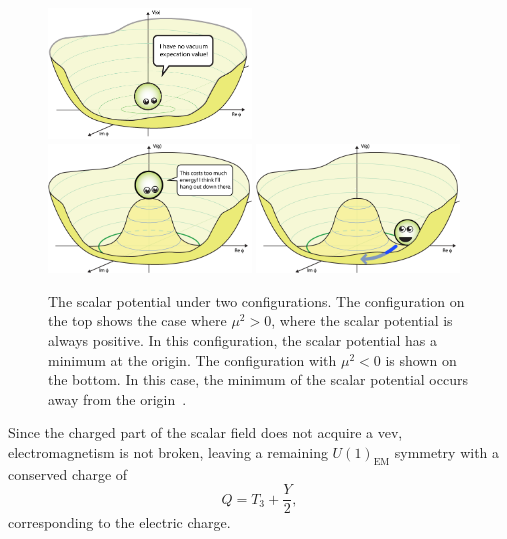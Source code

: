 \begin{figure}[th]
  \centering
  \includegraphics[width=0.48\textwidth]
      {figs/theory/BoringPotential.png}
  \\
  \includegraphics[width=0.48\textwidth]
  {figs/theory/Higgs-Potential-lookdown.png}
  \includegraphics[width=0.48\textwidth]
  {figs/theory/Higgs-Potential-Goldstone.png}
  \caption[
    The scalar potential under two configurations:
    $\mu^2 > 0$ and $\mu^2 < 0$~\cite{QuantumDiariesHiggs}.
  ]{
    The scalar potential under two configurations.
    The configuration on the top shows the case where $\mu^2 > 0$, where
    the scalar potential is always positive.
    In this configuration, the scalar potential has a minimum at the origin.
    The configuration with $\mu^2 < 0$ is shown on the bottom.
    In this case, the minimum of the scalar potential occurs away from the
    origin~\cite{QuantumDiariesHiggs}.
  }
  \label{fig:symmetry_breaking}
\end{figure}

Since the charged part of the scalar field does not acquire a vev,
electromagnetism is not broken, leaving a remaining $U(1)_\mathrm{EM}$
symmetry with a conserved charge of
\begin{equation}
  Q = T_3 + \frac{Y}{2},
\end{equation}
corresponding to the electric charge.

